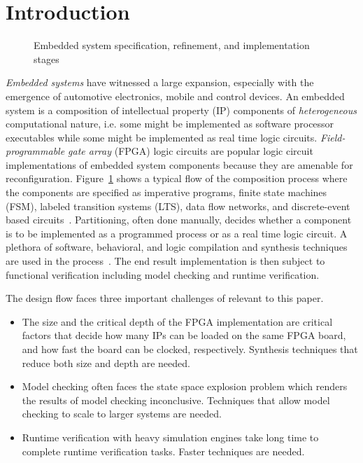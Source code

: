 \section{Introduction}
\label{sect-intro}

\begin{figure}
\resizebox{.9\columnwidth}{!}{
  
}
\caption{Embedded system specification, refinement, and implementation stages}
\label{fig:flow}
\end{figure}

{\em Embedded systems} have witnessed a large 
expansion, especially with  the emergence of automotive 
electronics, mobile and control devices.
%
An embedded system is a composition of intellectual property (IP) components
of {\em heterogeneous} computational nature, i.e. some might be implemented as software 
processor executables while some might be implemented as real time logic circuits. 
{\em Field-programmable gate array} (FPGA) logic circuits are popular logic circuit 
implementations of 
embedded system components because they are amenable for reconfiguration. 
%
Figure~\ref{fig:flow} shows a typical flow of the composition process where the
components are specified as imperative programs, finite state machines (FSM), labeled 
transition systems (LTS), data flow networks, and discrete-event based circuits~\cite{henzinger2006embedded}.
Partitioning, often done manually, decides whether a component is to 
be implemented as a programmed process or as a real time logic circuit. 
A plethora of software, behavioral, and logic compilation and synthesis techniques are
used in the process~\cite{metropolis2}.
The end result implementation is then subject to functional verification including 
model checking and runtime verification. 

The design flow faces three important challenges of relevant to this paper. 
\begin{itemize}
  \item The size and the critical depth of the FPGA implementation are critical factors that decide how many IPs can 
    be loaded on the same FPGA board, and how fast the board can be clocked, respectively. 
    Synthesis techniques that reduce both size and depth are needed. 
  \item Model checking often faces the state space explosion problem which renders the results of model checking inconclusive. 
    Techniques that allow model checking to scale to larger systems are needed. 
  \item Runtime verification with heavy simulation engines take long time to complete runtime verification tasks. 
    Faster techniques are needed. 
\end{itemize}

